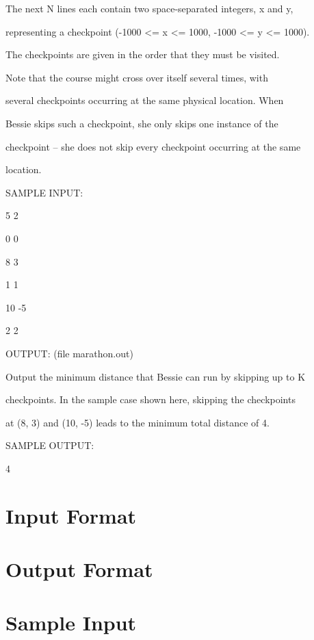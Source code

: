 \documentclass[12pt]{article}
\begin{document}
The next N lines each contain two space-separated integers, x and y,

representing a checkpoint (-1000 <= x <= 1000, -1000 <= y <= 1000).

The checkpoints are given in the order that they must be visited.

Note that the course might cross over itself several times, with

several checkpoints occurring at the same physical location.  When

Bessie skips such a checkpoint, she only skips one instance of the

checkpoint -- she does not skip every checkpoint occurring at the same

location.



SAMPLE INPUT:



5 2

0 0

8 3

1 1

10 -5

2 2



OUTPUT: (file marathon.out)



Output the minimum distance that Bessie can run by skipping up to K

checkpoints.  In the sample case shown here, skipping the checkpoints

at (8, 3) and (10, -5) leads to the minimum total distance of 4.



SAMPLE OUTPUT:



4




\section*{Input Format}


\section*{Output Format}


\section*{Sample Input}
\begin{verbatim}

\end{verbatim}
\end{document}
